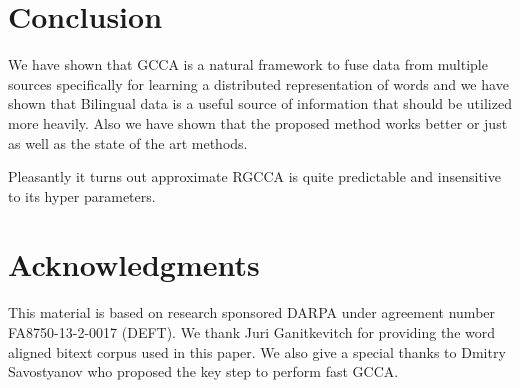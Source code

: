 \documentclass[11pt]{article}
\begin{document}
\section{Conclusion}
We have shown that GCCA is a natural framework to fuse data from
multiple sources specifically for learning a distributed
representation of words and we have shown that Bilingual data is a useful
source of information that should be utilized more heavily. Also we
have shown that the proposed method works better or just as well as
the state of the art methods.

Pleasantly it turns out approximate RGCCA is quite predictable and
insensitive to its hyper parameters.
\section*{Acknowledgments}
This material is based on research sponsored DARPA under agreement
number FA8750-13-2-0017 (DEFT). We thank Juri Ganitkevitch for
providing the word aligned bitext corpus used in this paper. We also
give a special thanks to Dmitry Savostyanov 
who proposed the key step to perform fast GCCA.


\end{document}
